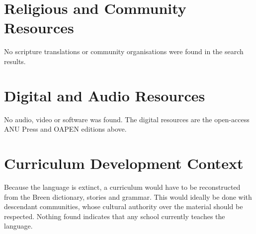 \documentclass[12pt]{article}
\begin{document}
\section{Religious and Community Resources}
No scripture translations or community organisations were found in the search results.

\section{Digital and Audio Resources}
No audio, video or software was found. The digital resources are the open-access ANU Press and OAPEN editions above.

\section{Curriculum Development Context}
Because the language is extinct, a curriculum would have to be reconstructed from the Breen dictionary, stories and grammar. This would ideally be done with descendant communities, whose cultural authority over the material should be respected. Nothing found indicates that any school currently teaches the language.
\end{document}
